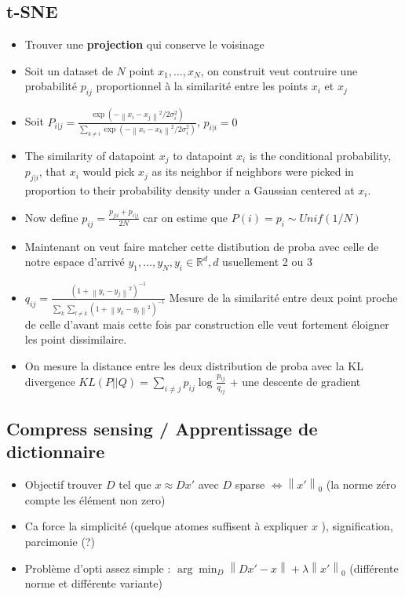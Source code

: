 \documentclass{article}
\theoremstyle{plain}%
\theoremstyle{definition}
\theoremstyle{remark}
\begin{document}
\subsection{t-SNE}
\begin{itemize}
    \item Trouver une \textbf{projection} qui conserve le voisinage
    \item Soit un dataset de $ N $ point $ x_1, \dots, x_N $, on construit veut contruire une probabilité $ p_{ij} $ proportionnel à la similarité entre les points $ x_i $ et $ x_j $ 
    \item Soit $ P_{i|j} = \frac{ \exp (- \left\| x_i - x_j \right\| ^2 / 2 \sigma_i ^2 ) }{\sum_{k \neq i}^{} \exp (- \left\| x_i - x_k \right\| ^2 / 2 \sigma_i ^2 ) } $, $ p_{i|i} = 0 $ 
    \item The similarity of datapoint $x_{j}$ to datapoint $x_{i}$ is the conditional probability, $ p_{j|i} $, that $x_{i}$ would pick $x_{j}$ as its neighbor if neighbors were picked in proportion to their probability density under a Gaussian centered at $x_{i}$.
    \item Now define $ p_{ij} = \frac{p_{j|i} + p_{i|j}}{2N}$ car on estime que $ P(i) = p_i \sim Unif (1/N) $ 
    \item Maintenant on veut faire matcher cette distibution de proba avec celle de notre espace d'arrivé $ y_1, \dots, y_N, y_i \in \mathbb{R}^d, d $ usuellement 2 ou 3
    \item $ q_{ij} = \frac{(1 + \left\| y_i - y_j \right\| ^2) ^{-1}}{\sum_{k}^{} \sum_{l \neq k}^{} ( 1 + \left\| y_k - y_l \right\| ^2) ^{-1}}$ Mesure de la similarité entre deux point proche de celle d'avant mais cette fois par construction elle veut fortement éloigner les point dissimilaire.
    \item On mesure la distance entre les deux distribution de proba avec la KL divergence $ KL(P || Q) = \sum_{i \neq j}^{}p_{ij} \log_{} \frac{p_{ij}}{q_{ij}} $ + une descente de gradient 
\end{itemize}

\subsection{Compress sensing / Apprentissage de dictionnaire}
\begin{itemize}
    \item Objectif trouver $ D $ tel que $ x \approx D x' $ avec $ D $ sparse $ \Leftrightarrow \left\| x' \right\|_0  $ (la norme zéro compte les élément non zero)
    \item Ca force la simplicité (quelque atomes suffisent à expliquer $ x $ ), signification, parcimonie (?)
    \item Problème d'opti assez simple : $ \arg \min _D \left\| D x' - x \right\| + \lambda \left\| x' \right\| _0 $ (différente norme et différente variante)
\end{itemize}
\end{document}
